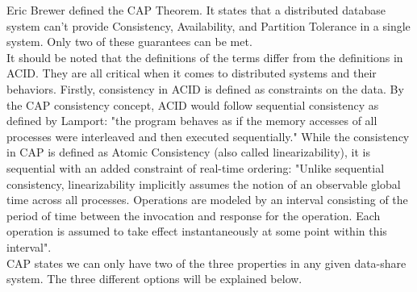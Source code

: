 \documentclass[a4paper,10pt,titlepage]{report}
\begin{document}
    Eric Brewer defined the CAP Theorem\cite{CAP}. It states that a distributed database system can't provide Consistency, Availability, and Partition Tolerance in a single system. Only two of these guarantees can be met.\\
    \vspace{5mm}
    It should be noted that the definitions of the terms differ from the definitions in ACID. They are all critical when it comes to distributed systems and their behaviors. Firstly, consistency in ACID is defined as constraints on the data. By the CAP consistency concept, ACID would follow sequential consistency as defined by Lamport\cite{lamport1993how}: "the program behaves as if the memory accesses of all processes were interleaved and then executed sequentially." While the consistency in CAP is defined as Atomic Consistency (also called linearizability), it is sequential with an added constraint of real-time ordering: "Unlike sequential consistency, linearizability implicitly assumes the notion of an observable global time across all processes. Operations are modeled by an interval consisting of the period of time between the invocation and response for the operation. Each operation is assumed to take effect instantaneously at some point within this interval". \cite{CSL-TR-95-685} \\
    \vspace{5mm}
    CAP states we can only have two of the three properties in any given data-share system. The three different options will be explained below.
\end{document}
